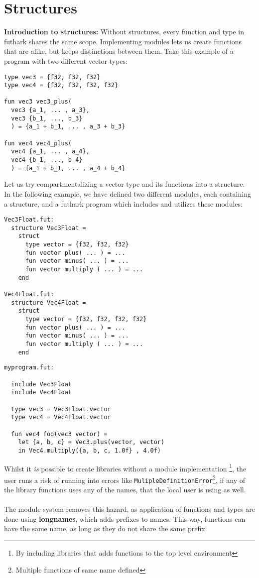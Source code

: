 \section{Structures}
\label{sec:structures}
\textbf{Introduction to structures:}
\label{subsec:structuresaregood}
Without structures, every function and type in futhark shares the same scope.
Implementing modules lets us create functions that are alike, but keeps
distinctions between them.
Take this example of a program with two different vector types:

\begin{verbatim}
type vec3 = {f32, f32, f32}
type vec4 = {f32, f32, f32, f32}

fun vec3 vec3_plus(
  vec3 {a_1, ... , a_3}, 
  vec3 {b_1, ..., b_3}
  ) = {a_1 + b_1, ... , a_3 + b_3}

fun vec4 vec4_plus(
  vec4 {a_1, ... , a_4}, 
  vec4 {b_1, ..., b_4}
  ) = {a_1 + b_1, ... , a_4 + b_4}
\end{verbatim}
\noindent
Let us try compartmentalizing a vector type and its functions into a structure.\\
  In the following example, we have defined two different modules, each
containing a structure,
and a futhark program which includes and utilizes these modules:
\begin{verbatim}
Vec3Float.fut:
  structure Vec3Float = 
    struct
      type vector = {f32, f32, f32}
      fun vector plus( ... ) = ...
      fun vector minus( ... ) = ...
      fun vector multiply ( ... ) = ...
    end

Vec4Float.fut:
  structure Vec4Float = 
    struct
      type vector = {f32, f32, f32, f32}
      fun vector plus( ... ) = ...
      fun vector minus( ... ) = ...
      fun vector multiply ( ... ) = ...
    end
\end{verbatim}
\clearpage
\begin{verbatim}
myprogram.fut:

  include Vec3Float
  include Vec4Float

  type vec3 = Vec3Float.vector
  type vec4 = Vec4Float.vector
  
  fun vec4 foo(vec3 vector) = 
    let {a, b, c} = Vec3.plus(vector, vector)
    in Vec4.multiply({a, b, c, 1.0f} , 4.0f)
\end{verbatim}
\noindent
Whilst it \textit{is} possible to create libraries without a module
implementation \footnote{By including libraries that adds functions to the top
  level environment}, the user runs a risk of running into errors like
\texttt{MulipleDefinitionError}\footnote{Multiple functions of same name
  defined}, if any of the library functions uses any of the names, that the
local user is using as well.
\\\\
The module system removes this hazard, as application of functions and types are
done using \textbf{longnames}, which adds prefixes to names. This way, functions
can have the same name, as long as they do not share the same prefix.


